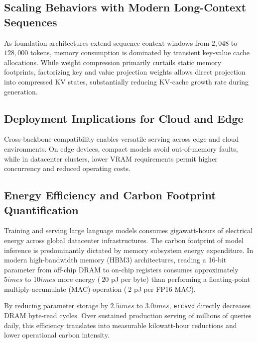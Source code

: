 \subsection{Scaling Behaviors with Modern Long-Context Sequences}
As foundation architectures extend sequence context windows from $2{,}048$ to $128{,}000$ tokens, memory consumption is dominated by transient key-value cache allocations. While weight compression primarily curtails static memory footprints, factorizing key and value projection weights allows direct projection into compressed KV states, substantially reducing KV-cache growth rate during generation.

\subsection{Deployment Implications for Cloud and Edge}
Cross-backbone compatibility enables versatile serving across edge and cloud environments. On edge devices, compact models avoid out-of-memory faults, while in datacenter clusters, lower VRAM requirements permit higher concurrency and reduced operating costs.

\subsection{Energy Efficiency and Carbon Footprint Quantification}
Training and serving large language models consumes gigawatt-hours of electrical energy across global datacenter infrastructures. The carbon footprint of model inference is predominantly dictated by memory subsystem energy expenditure. In modern high-bandwidth memory (HBM3) architectures, reading a 16-bit parameter from off-chip DRAM to on-chip registers consumes approximately $5	imes$ to $10	imes$ more energy ($~20$ pJ per byte) than performing a floating-point multiply-accumulate (MAC) operation ($~2$ pJ per FP16 MAC).

By reducing parameter storage by $2.5	imes$ to $3.0	imes$, \texttt{ercsvd} directly decreases DRAM byte-read cycles. Over sustained production serving of millions of queries daily, this efficiency translates into measurable kilowatt-hour reductions and lower operational carbon intensity.
